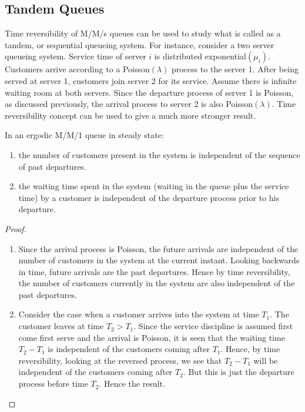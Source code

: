 \documentclass[a4paper,10pt]{article}
\begin{document}
\subsection{Tandem Queues}
Time reversibility of M/M/s queues can be used to study what is called as a tandem, or sequential queueing system. For instance, consider a two server queueing system. Service time of server $i$ is distributed exponential$(\mu_i)$. Customers arrive according to a Poisson$(\lambda)$ process to the server 1. After being served at server 1, customers join server  2 for its service. Assume there is infinite waiting room at both servers. Since the departure process of server 1 is Poisson, as discussed previously, the arrival process to server 2 is also Poisson$(\lambda)$. Time reversibility concept can be used to give a much more stronger result.
\begin{lem}
In an ergodic M/M/1 queue in steady state:
\begin{enumerate}
\item the number of customers present in the system is independent of the sequence of past departures.
\item the waiting time spent in the system (waiting in the queue plus the service time) by a customer is independent of the departure process prior to his departure.
\end{enumerate} 
\begin{proof}
\begin{enumerate}
\item Since the arrival process is Poisson, the future arrivals are independent of the number of customers in the system at the current instant. Looking backwards in time, future arrivals are the past departures. Hence by time reversibility, the number of customers currently in the system are also independent of the past departures.
\item Consider the case when a customer arrives into the system at time $T_1$. The customer leaves at time $T_2>T_1$.  Since the service discipline is assumed first come first serve and the arrival is Poisson, it is seen that the waiting time $T_2-T_1$ is independent of the customers coming after $T_1$. Hence, by time reversibility, looking at the reversed process, we see that $T_2-T_1$  will be independent of the customers coming after $T_2$. But this is just the departure process before time $T_2$. Hence the result.
\end{enumerate}
\end{proof}
\end{lem} 
\end{document}
